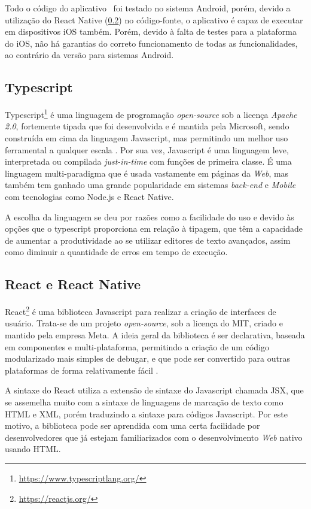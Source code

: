 Todo o código do aplicativo \appName\ foi testado no sistema Android, porém, devido a utilização do React Native (\ref{react-section}) no código-fonte, o aplicativo é capaz de executar em dispositivos iOS também. Porém, devido à falta de testes para a plataforma do iOS, não há garantias do correto funcionamento de todas as funcionalidades, ao contrário da versão para sistemas Android.

\subsection{Typescript}

Typescript\footnote{\url{https://www.typescriptlang.org/}} é uma linguagem de programação \textit{open-source} sob a licença \textit{Apache 2.0}, fortemente tipada que foi desenvolvida e é mantida pela Microsoft, sendo construída em cima da linguagem Javascript, mas permitindo um melhor uso ferramental a qualquer escala \cite{typescript}. Por sua vez, Javascript \cite{javascript} é uma linguagem leve, interpretada ou compilada \textit{just-in-time} com funções de primeira classe. É uma linguagem multi-paradigma que é usada vastamente em páginas da \textit{Web}, mas também tem ganhado uma grande popularidade em sistemas \textit{back-end} e \textit{Mobile} com tecnologias como Node.js e React Native.

A escolha da linguagem se deu por razões como a facilidade do uso e devido às opções que o typescript proporciona em relação à tipagem, que têm a capacidade de aumentar a produtividade ao se utilizar editores de texto avançados, assim como diminuir a quantidade de erros em tempo de execução.

\subsection{React e React Native}
\label{react-section}

React\footnote{\url{https://reactjs.org/}} é uma biblioteca Javascript para realizar a criação de interfaces de usuário. Trata-se de um projeto \textit{open-source}, sob a licença do MIT, criado e mantido pela empresa Meta. A ideia geral da biblioteca é ser declarativa, baseada em componentes e multi-plataforma, permitindo a criação de um código modularizado mais simples de debugar, e que pode ser convertido para outras plataformas de forma relativamente fácil \cite{react}.

A sintaxe do React utiliza a extensão de sintaxe do Javascript chamada JSX, que se assemelha muito com a sintaxe de linguagens de marcação de texto como HTML e XML, porém traduzindo a sintaxe para códigos Javascript. Por este motivo, a biblioteca pode ser aprendida com uma certa facilidade por desenvolvedores que já estejam familiarizados com o desenvolvimento \textit{Web} nativo usando HTML.

